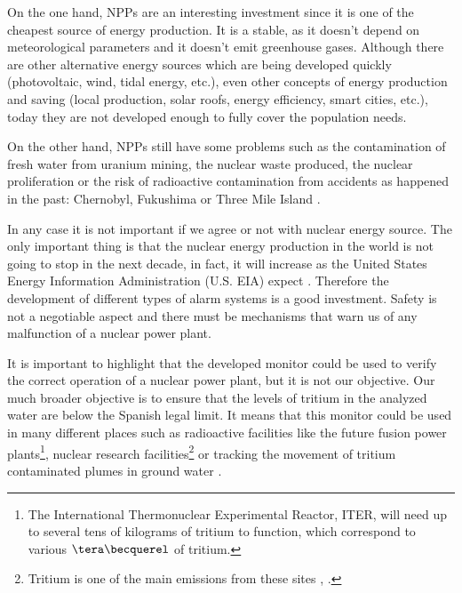 On the one hand, NPPs are an interesting investment since it is one of the cheapest source of energy production. It is a stable, as it doesn't depend on  meteorological parameters and it doesn't emit greenhouse gases. Although there are other alternative energy sources which are being developed quickly  (photovoltaic, wind, tidal energy, etc.), even other concepts of energy production and saving (local production, solar roofs, energy efficiency, smart cities, etc.), today they are not developed enough to fully cover the population needs.  

On the other hand, NPPs still have some problems such as the contamination of fresh water from uranium mining, the nuclear waste produced, the nuclear proliferation or the risk of radioactive contamination from accidents as happened in the past: Chernobyl, Fukushima or Three Mile Island \cite{ThreeMileIsland}.

In any case it is not important if we agree or not with nuclear energy source. The only important thing is that the nuclear energy production in the world is not going to stop in the next decade, in fact, it will increase as the United States Energy Information Administration (U.S. EIA) expect \cite{EIAOutlook}. Therefore the development of  different types of alarm systems is a good investment. Safety is not a negotiable aspect and there must be mechanisms that warn us of any malfunction of a nuclear power plant. 

It is important to highlight that the developed monitor could be used to verify the correct operation of a nuclear power plant, but it is not our objective. Our much broader objective is to ensure that the levels of tritium in the analyzed water are below the Spanish legal limit. It means that this monitor could be used in many different places such as radioactive facilities like the future fusion power plants\footnote{The International Thermonuclear Experimental Reactor, ITER, will need up to several tens of kilograms of tritium to function, which correspond to various $\tera\becquerel$ of tritium.}, nuclear research facilities\footnote{Tritium is one of the main emissions from these sites \cite{FERMILAB}, \cite{BrookHavenNationalLaboratory}.} or tracking the movement of tritium contaminated plumes in ground water \cite{TrackingTritium}. 

